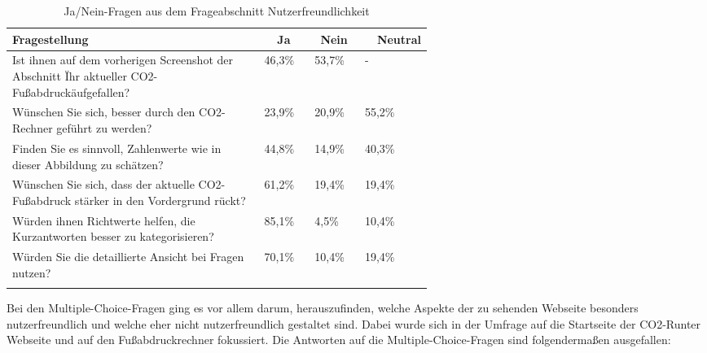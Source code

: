 \begin{longtable}{|p{0.6\linewidth}|l|l|l|}
    \hline
    \multicolumn{1}{|l|}{\textbf{Fragestellung}}                                                        &
    \multicolumn{1}{c|}{\textbf{Ja}}                                                                    &
    \multicolumn{1}{c|}{\textbf{Nein}}                                                                  &
    \multicolumn{1}{r|}{\textbf{Neutral}}                                                                                          \\ \hline
    \endfirsthead

    Ist ihnen auf dem vorherigen Screenshot der Abschnitt \"Ihr aktueller CO2-Fußabdruck\" aufgefallen? & 46,3\% & 53,7\% & -      \\ \hline
    Wünschen Sie sich, besser durch den            CO2-Rechner geführt zu werden?                       & 23,9\% & 20,9\% & 55,2\% \\ \hline
    Finden Sie es sinnvoll, Zahlenwerte            wie in dieser Abbildung zu schätzen?                 & 44,8\% & 14,9\% & 40,3\% \\ \hline
    Wünschen Sie sich, dass der aktuelle           CO2-Fußabdruck stärker in den Vordergrund rückt?     & 61,2\% & 19,4\% & 19,4\% \\ \hline
    Würden ihnen Richtwerte helfen, die            Kurzantworten besser zu kategorisieren?              & 85,1\% & 4,5\%  & 10,4\% \\ \hline
    Würden Sie die detaillierte Ansicht            bei Fragen nutzen?                                   & 70,1\% & 10,4\% & 19,4\% \\ \hline
    \caption{Ja/Nein-Fragen aus dem Frageabschnitt Nutzerfreundlichkeit}
    \label{nutzerfreundlichkeitFragen}
    \\
\end{longtable}

Bei den Multiple-Choice-Fragen ging es vor allem darum, herauszufinden, welche Aspekte der zu sehenden Webseite besonders nutzerfreundlich und welche eher nicht nutzerfreundlich gestaltet sind.
Dabei wurde sich in der Umfrage auf die Startseite der CO2-Runter Webseite und auf den Fußabdruckrechner fokussiert.
Die Antworten auf die Multiple-Choice-Fragen sind folgendermaßen ausgefallen:

